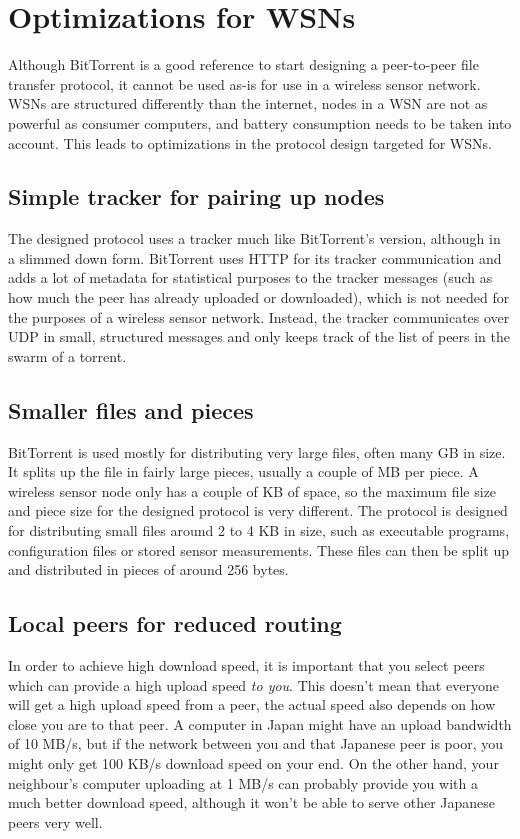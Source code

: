 \documentclass[ DIV=calc,%
                paper=a4,%
                fontsize=12pt,%
                twocolumn%
              ]{scrartcl}	 			%
\begin{document}
\section*{Optimizations for WSNs}
Although BitTorrent is a good reference to start designing a peer-to-peer file transfer protocol, it cannot be used as-is for use in a wireless sensor network. WSNs are structured differently than the internet, nodes in a WSN are not as powerful as consumer computers, and battery consumption needs to be taken into account. This leads to optimizations in the protocol design targeted for WSNs.

\subsection*{Simple tracker for pairing up nodes}
The designed protocol uses a tracker much like BitTorrent's version, although in a slimmed down form. BitTorrent uses HTTP for its tracker communication and adds a lot of metadata for statistical purposes to the tracker messages (such as how much the peer has already uploaded or downloaded), which is not needed for the purposes of a wireless sensor network. Instead, the tracker communicates over UDP in small, structured messages and only keeps track of the list of peers in the swarm of a torrent.

\subsection*{Smaller files and pieces}
BitTorrent is used mostly for distributing very large files, often many GB in size. It splits up the file in fairly large pieces, usually a couple of MB per piece. A wireless sensor node only has a couple of KB of space, so the maximum file size and piece size for the designed protocol is very different. The protocol is designed for distributing small files around 2 to 4 KB in size, such as executable programs, configuration files or stored sensor measurements. These files can then be split up and distributed in pieces of around 256 bytes.

\subsection*{Local peers for reduced routing}
In order to achieve high download speed, it is important that you select peers which can provide a high upload speed \emph{to you}. This doesn't mean that everyone will get a high upload speed from a peer, the actual speed also depends on how close you are to that peer. A computer in Japan might have an upload bandwidth of 10 MB/s, but if the network between you and that Japanese peer is poor, you might only get 100 KB/s download speed on your end. On the other hand, your neighbour's computer uploading at 1 MB/s can probably provide you with a much better download speed, although it won't be able to serve other Japanese peers very well.
\end{document}
